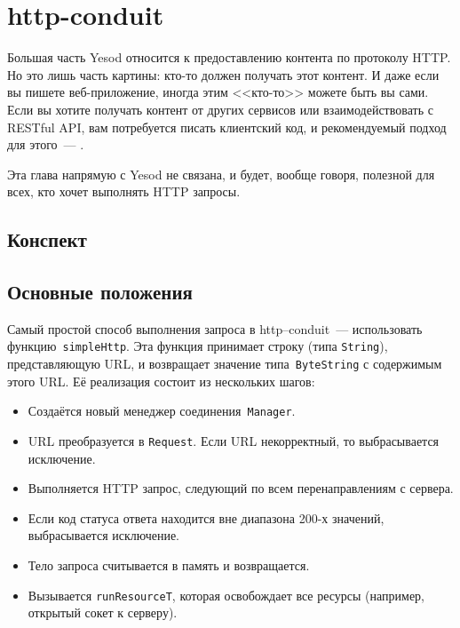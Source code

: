 \chapter{http-conduit}
Большая часть Yesod относится к предоставлению контента по протоколу HTTP. Но
это лишь часть картины: кто-то должен получать этот контент. И даже если вы
пишете веб-приложение, иногда этим <<кто-то>> можете быть вы сами. Если вы
хотите получать контент от других сервисов или взаимодействовать с RESTful API,
вам потребуется писать клиентский код, и рекомендуемый подход для этого~---
.

Эта глава напрямую с Yesod не связана, и будет, вообще говоря, полезной для
всех, кто хочет выполнять HTTP запросы.

\section{Конспект}

\section{Основные положения}
Самый простой способ выполнения запроса в http--conduit~--- использовать
функцию~\lstinline!simpleHttp!. Эта функция принимает строку (типа
\lstinline!String!), представляющую URL, и возвращает значение
типа~\lstinline!ByteString! с содержимым этого URL. Её реализация состоит из
нескольких шагов:
\begin{itemize}
    \item Создаётся новый менеджер соединения~\lstinline!Manager!.

    \item URL преобразуется в \lstinline!Request!. Если URL некорректный, то
        выбрасывается исключение.

    \item Выполняется HTTP запрос, следующий по всем перенаправлениям с
        сервера.

    \item Если код статуса ответа находится вне диапазона 200-х значений,
        выбрасывается исключение.

    \item Тело запроса считывается в память и возвращается.

    \item Вызывается \lstinline!runResourceT!, которая освобождает все ресурсы
        (например, открытый сокет к серверу).
\end{itemize}


